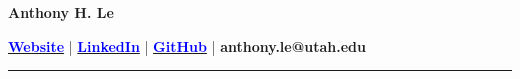 \documentclass[10pt]{letter}
\begin{document}
\begin{center}
\textbf{\Large \textbf{Anthony H. Le}} \\
\end{center}
\vspace{-10pt}
\begin{center}
    \href{https://anthonyhle.com/}{\textbf{\textcolor{blue}{Website}}} | \href{https://www.linkedin.com/in/anth0nyhle/}{\textbf{\textcolor{blue}{LinkedIn}}} |  \href{https://github.com/anth0nyhle}{\textbf{\textcolor{blue}{GitHub}}} | \textbf{anthony.le@utah.edu}
\end{center}
\vspace{-10pt}




\par\noindent\rule{\textwidth}{0.5pt}

\end{document}
